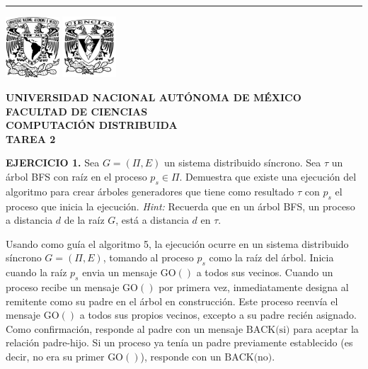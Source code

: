 \documentclass[12pt]{article}
\begin{document}
\begin{center}
    \hrule
    \vspace{0.3cm}
    \includegraphics[width=0.15\textwidth]{img/escudo-unam.png}
    \hfill
    \includegraphics[width=0.15\textwidth]{img/escudo-ciencias.png}
    
    \vspace{-3cm}
    \begin{minipage}{0.7\textwidth}
        \centering
        {\medium \textbf{UNIVERSIDAD NACIONAL AUTÓNOMA DE MÉXICO}}\\[0.2cm]
        {\medium \textbf{FACULTAD DE CIENCIAS}}\\[0.2cm]
        {\medium \textbf{COMPUTACIÓN DISTRIBUIDA}}\\[0.2cm]
        {\medium \textbf{TAREA 2}}\\
    \end{minipage}
    \vspace{0.3cm}
\end{center}

\vspace{0.8cm}

\begin{ejercicio}
\noindent \textbf{EJERCICIO 1.} 
Sea $G = (\Pi, E)$ un sistema distribuido síncrono. Sea $\tau$ un árbol BFS con raíz en
el proceso $p_s \in \Pi$. Demuestra que existe una ejecución del algoritmo para crear árboles
generadores que tiene como resultado $\tau$ con $p_s$ el proceso que inicia la ejecución. 
\textit{Hint:} Recuerda que en un árbol BFS, un proceso a distancia $d$ de la raíz $G$, está a distancia $d$ en $\tau$. \\
\end{ejercicio}

\noindent Usando como guía el algoritmo 5, la ejecuci\'on ocurre en un sistema distribuido s\'incrono $G = (\Pi, E)$, tomando al proceso $p_s$ como la ra\'iz del \'arbol. Inicia cuando la ra\'iz $p_s$ envia un mensaje $\text{GO}()$ a todos sus vecinos. Cuando un proceso recibe un mensaje $\text{GO}()$ por primera vez, inmediatamente designa al remitente como su padre en el \'arbol en construcci\'on. Este proceso reenv\'ia el mensaje $\text{GO}()$ a todos sus propios vecinos, excepto a su padre reci\'en asignado. Como confirmaci\'on, responde al padre con un mensaje $\text{BACK(si)}$ para aceptar la relaci\'on padre-hijo. Si un proceso ya ten\'ia un padre previamente establecido (es decir, no era su primer $\text{GO}()$), responde con un $\text{BACK(no)}$.\\
\end{document}
